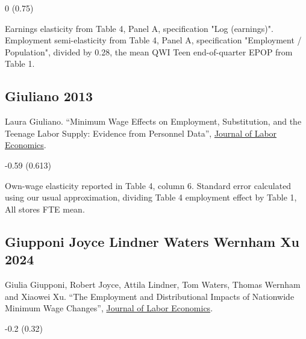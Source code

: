 \vspace{0.7em}

 0 (0.75)

\vspace{0.7em}

 Earnings elasticity from Table 4, Panel A, specification "Log (earnings)". Employment semi-elasticity from Table 4, Panel A, specification "Employment / Population", divided by 0.28, the mean QWI Teen end-of-quarter EPOP from Table 1.

\subsection*{Giuliano 2013}
\vspace{-0.7em}

\noindent Laura Giuliano. ``Minimum Wage Effects on Employment, Substitution, and the Teenage Labor Supply: Evidence from Personnel Data'', \href{https://doi.org/10.1086/666921}{Journal of Labor Economics}.

\vspace{0.7em}

 -0.59 (0.613)

\vspace{0.7em}

 Own-wage elasticity reported in Table 4, column 6. Standard error calculated using our usual approximation, dividing Table 4 employment effect by Table 1, All stores FTE mean.

\subsection*{Giupponi Joyce Lindner Waters Wernham Xu 2024}
\vspace{-0.7em}

\noindent Giulia Giupponi, Robert Joyce, Attila Lindner, Tom Waters, Thomas Wernham and Xiaowei Xu. ``The Employment and Distributional Impacts of Nationwide Minimum Wage Changes'', \href{https://www.dropbox.com/s/esmr58nm6mbs0zu/JOLE_NLW.pdf}{Journal of Labor Economics}.

\vspace{0.7em}

 -0.2 (0.32)

\vspace{0.7em}

